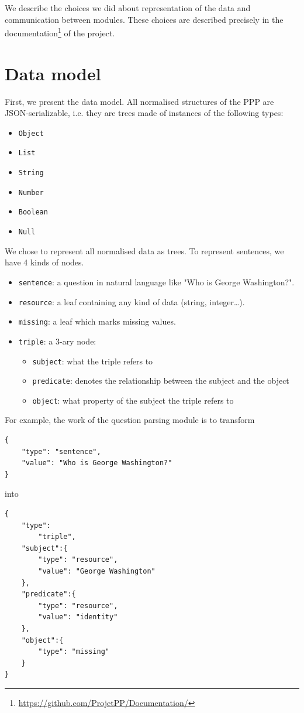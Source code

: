 We describe the choices we did about representation of the data and communication between modules.
These choices are described precisely in the documentation\footnote{\url{https://github.com/ProjetPP/Documentation/}} of the project.

\section{Data model}
\label{rdf}

First, we present the data model. All normalised structures of the PPP are JSON-serializable, i.e. they are trees made of instances of the following types:
\begin{itemize}
    \item \texttt{Object}
    \item \texttt{List}
    \item \texttt{String}
    \item \texttt{Number}
    \item \texttt{Boolean}
    \item \texttt{Null}
\end{itemize}

We chose to represent all normalised data as trees. To represent sentences, we have 4 kinds of nodes.

\begin{itemize}
    \item \texttt{sentence}: a question in natural language like "Who is George Washington?".
    \item \texttt{resource}: a leaf containing any kind of data (string, integer\ldots).
    \item \texttt{missing}: a leaf which marks missing values.
    \item \texttt{triple}: a 3-ary node:
        \begin{itemize}
            \item \texttt{subject}: what the triple refers to
            \item \texttt{predicate}: denotes the relationship between the subject and the
  object
            \item \texttt{object}: what property of the subject the triple refers to
        \end{itemize}         
\end{itemize}

For example, the work of the question parsing module is to transform 
\begin{verbatim}
{
    "type": "sentence", 
    "value": "Who is George Washington?"
}
\end{verbatim}
into 
\begin{verbatim}
{
    "type":
        "triple",
    "subject":{
        "type": "resource",
        "value": "George Washington"
    },
    "predicate":{
        "type": "resource",
        "value": "identity"
    },
    "object":{
        "type": "missing"
    }
}
\end{verbatim}

